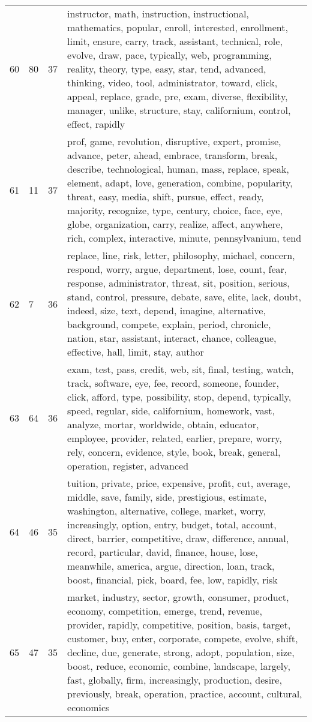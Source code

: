 \begin{table}[ht]
{\begin{tabularx}{\textwidth}{llrX}
   60 & 80 & 37 & instructor, math, instruction, instructional, mathematics, popular, enroll, interested, enrollment, limit, ensure, carry, track, assistant, technical, role, evolve, draw, pace, typically, web, programming, reality, theory, type, easy, star, tend, advanced, thinking, video, tool, administrator, toward, click, appeal, replace, grade, pre, exam, diverse, flexibility, manager, unlike, structure, stay, californium, control, effect, rapidly \\ 
   61 & 11 & 37 & prof, game, revolution, disruptive, expert, promise, advance, peter, ahead, embrace, transform, break, describe, technological, human, mass, replace, speak, element, adapt, love, generation, combine, popularity, threat, easy, media, shift, pursue, effect, ready, majority, recognize, type, century, choice, face, eye, globe, organization, carry, realize, affect, anywhere, rich, complex, interactive, minute, pennsylvanium, tend \\ 
   62 & 7 & 36 & replace, line, risk, letter, philosophy, michael, concern, respond, worry, argue, department, lose, count, fear, response, administrator, threat, sit, position, serious, stand, control, pressure, debate, save, elite, lack, doubt, indeed, size, text, depend, imagine, alternative, background, compete, explain, period, chronicle, nation, star, assistant, interact, chance, colleague, effective, hall, limit, stay, author \\ 
   63 & 64 & 36 & exam, test, pass, credit, web, sit, final, testing, watch, track, software, eye, fee, record, someone, founder, click, afford, type, possibility, stop, depend, typically, speed, regular, side, californium, homework, vast, analyze, mortar, worldwide, obtain, educator, employee, provider, related, earlier, prepare, worry, rely, concern, evidence, style, book, break, general, operation, register, advanced \\ 
   64 & 46 & 35 & tuition, private, price, expensive, profit, cut, average, middle, save, family, side, prestigious, estimate, washington, alternative, college, market, worry, increasingly, option, entry, budget, total, account, direct, barrier, competitive, draw, difference, annual, record, particular, david, finance, house, lose, meanwhile, america, argue, direction, loan, track, boost, financial, pick, board, fee, low, rapidly, risk \\ 
   65 & 47 & 35 & market, industry, sector, growth, consumer, product, economy, competition, emerge, trend, revenue, provider, rapidly, competitive, position, basis, target, customer, buy, enter, corporate, compete, evolve, shift, decline, due, generate, strong, adopt, population, size, boost, reduce, economic, combine, landscape, largely, fast, globally, firm, increasingly, production, desire, previously, break, operation, practice, account, cultural, economics \\ 

\end{tabularx}}
\end{table}
